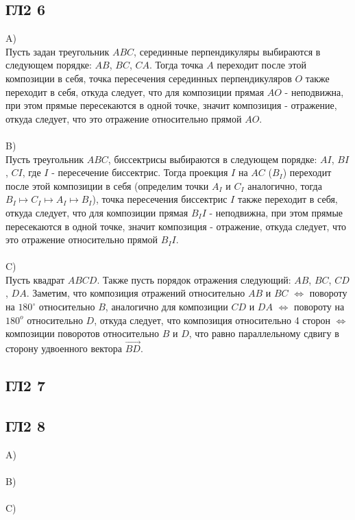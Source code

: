 		\subsection{ГЛ2 6}		
		A)\\
		Пусть задан треугольник $ABC$, серединные перпендикуляры выбираются в следующем порядке: $AB$, $BC$, $CA$. Тогда точка $A$ переходит после этой композиции в себя, точка пересечения серединных перпендикуляров $O$ также переходит в себя, откуда следует, что для композиции прямая $AO$ - неподвижна, при этом прямые пересекаются в одной точке, значит композиция - отражение, откуда следует, что это отражение относительно прямой $AO$.
		\\ \\
		B)\\
		Пусть треугольник $ABC$, биссектрисы выбираются в следующем порядке: $AI$, $BI$, $CI$, где $I$ - пересечение биссектрис. Тогда проекция $I$ на $AC$ ($B_I$) переходит после этой композиции в себя (определим точки $A_I$ и $C_I$ аналогично, тогда $B_I \mapsto C_I \mapsto A_I \mapsto B_I$), точка пересечения биссектрис $I$ также переходит в себя, откуда следует, что для композиции прямая $B_I I$ - неподвижна, при этом прямые пересекаются в одной точке, значит композиция - отражение, откуда следует, что это отражение относительно прямой $B_I I$.
		\\ \\
		C)\\
		Пусть квадрат $ABCD$. Также пусть порядок отражения следующий: $AB$, $BC$, $CD$, $DA$. Заметим, что композиция отражений относительно $AB$ и $BC$  $\Leftrightarrow$ повороту на $180^\circ$ относительно $B$, аналогично для композиции $CD$ и $DA$ $\Leftrightarrow$ повороту на $180^o$ относительно $D$, откуда следует, что композиция относительно 4 сторон $\Leftrightarrow$ композиции поворотов относительно $B$ и $D$, что равно параллельному сдвигу в сторону удвоенного вектора $\overrightarrow{BD}$.
		
		\subsection{ГЛ2 7}		
		
		
		\subsection{ГЛ2 8}		
		A)\\
		\\
		B)\\
		\\
		C)\\
		\\
		
